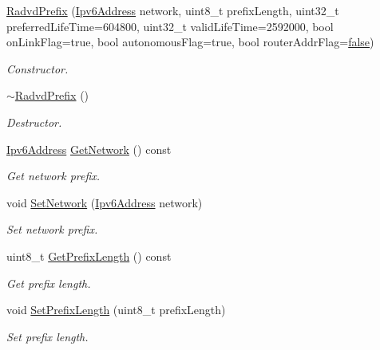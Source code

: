 \begin{DoxyCompactItemize}
\item 
\hyperlink{classns3_1_1RadvdPrefix_a8a9148382edebf588b47c5c80dd9bde7}{Radvd\+Prefix} (\hyperlink{classns3_1_1Ipv6Address}{Ipv6\+Address} network, uint8\+\_\+t prefix\+Length, uint32\+\_\+t preferred\+Life\+Time=604800, uint32\+\_\+t valid\+Life\+Time=2592000, bool on\+Link\+Flag=true, bool autonomous\+Flag=true, bool router\+Addr\+Flag=\hyperlink{lte__cqi__generation_8m_ab1bef239d413c4da139c4bac92cd657a}{false})
\begin{DoxyCompactList}\small\item\em Constructor. \end{DoxyCompactList}\item 
\hyperlink{classns3_1_1RadvdPrefix_a9469ddc1d829b6f5787ed3a28e12572f}{$\sim$\+Radvd\+Prefix} ()
\begin{DoxyCompactList}\small\item\em Destructor. \end{DoxyCompactList}\item 
\hyperlink{classns3_1_1Ipv6Address}{Ipv6\+Address} \hyperlink{classns3_1_1RadvdPrefix_ae5a3880060b345d5f07b40487a2b0cf8}{Get\+Network} () const 
\begin{DoxyCompactList}\small\item\em Get network prefix. \end{DoxyCompactList}\item 
void \hyperlink{classns3_1_1RadvdPrefix_a2b0b703287e54710fca9939893ca5920}{Set\+Network} (\hyperlink{classns3_1_1Ipv6Address}{Ipv6\+Address} network)
\begin{DoxyCompactList}\small\item\em Set network prefix. \end{DoxyCompactList}\item 
uint8\+\_\+t \hyperlink{classns3_1_1RadvdPrefix_a2de8eb5ce2e95dba534bc93081a50e1a}{Get\+Prefix\+Length} () const 
\begin{DoxyCompactList}\small\item\em Get prefix length. \end{DoxyCompactList}\item 
void \hyperlink{classns3_1_1RadvdPrefix_af96d11c4e6b54c8dc7e6fa3a579454c1}{Set\+Prefix\+Length} (uint8\+\_\+t prefix\+Length)
\begin{DoxyCompactList}\small\item\em Set prefix length. \end{DoxyCompactList}\item 

\end{DoxyCompactItemize}
